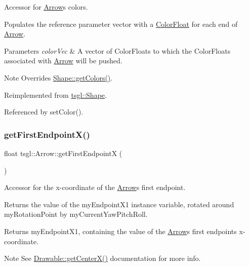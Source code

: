Accessor for \hyperlink{classtsgl_1_1_arrow}{Arrow}\textquotesingle{}s colors. 

Populates the reference parameter vector with a \hyperlink{structtsgl_1_1_color_float}{Color\+Float} for each end of \hyperlink{classtsgl_1_1_arrow}{Arrow}. 
\begin{DoxyParams}{Parameters}
{\em color\+Vec} & A vector of Color\+Floats to which the Color\+Floats associated with \hyperlink{classtsgl_1_1_arrow}{Arrow} will be pushed. \\
\hline
\end{DoxyParams}
\begin{DoxyNote}{Note}
Overrides \hyperlink{classtsgl_1_1_shape_a6f54fe4d049f69a287edf8335a9509f8}{Shape\+::get\+Colors()}. 
\end{DoxyNote}


Reimplemented from \hyperlink{classtsgl_1_1_shape_a6f54fe4d049f69a287edf8335a9509f8}{tsgl\+::\+Shape}.



Referenced by set\+Color().

\mbox{\label{classtsgl_1_1_arrow_a56f3590dcd62f465958f8b8e103dac4f}} 
\subsubsection{\texorpdfstring{get\+First\+Endpoint\+X()}{getFirstEndpointX()}}
{\footnotesize\ttfamily float tsgl\+::\+Arrow\+::get\+First\+EndpointX (\begin{DoxyParamCaption}{ }\end{DoxyParamCaption})}



Accessor for the x-\/coordinate of the \hyperlink{classtsgl_1_1_arrow}{Arrow}\textquotesingle{}s first endpoint. 

Returns the value of the my\+Endpoint\+X1 instance variable, rotated around my\+Rotation\+Point by my\+Current\+Yaw\+Pitch\+Roll. \begin{DoxyReturn}{Returns}
my\+Endpoint\+X1, containing the value of the \hyperlink{classtsgl_1_1_arrow}{Arrow}\textquotesingle{}s first endpoint\textquotesingle{}s x-\/coordinate. 
\end{DoxyReturn}
\begin{DoxyNote}{Note}
See \hyperlink{classtsgl_1_1_drawable_a170ce95eaae8b19532420e42e9eb8abf}{Drawable\+::get\+Center\+X()} documentation for more info. 
\end{DoxyNote}


